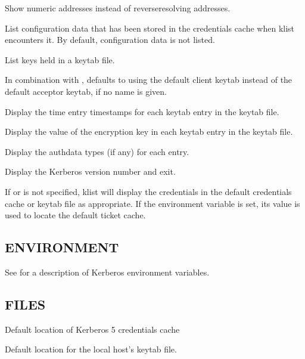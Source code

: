 \documentclass[letterpaper,10pt,english]{sphinxmanual}
\begin{document}
\begin{description}
\sphinxAtStartPar
Show numeric addresses instead of reverse\sphinxhyphen{}resolving addresses.

\sphinxAtStartPar
List configuration data that has been stored in the credentials
cache when klist encounters it.  By default, configuration data
is not listed.

\sphinxAtStartPar
List keys held in a keytab file.

\sphinxAtStartPar
In combination with , defaults to using the default client
keytab instead of the default acceptor keytab, if no name is
given.

\sphinxAtStartPar
Display the time entry timestamps for each keytab entry in the
keytab file.

\sphinxAtStartPar
Display the value of the encryption key in each keytab entry in
the keytab file.

\sphinxAtStartPar
Display the authdata types (if any) for each entry.

\sphinxAtStartPar
Display the Kerberos version number and exit.

\end{description}

\sphinxAtStartPar
If  or  is not specified, klist will display
the credentials in the default credentials cache or keytab file as
appropriate.  If the  environment variable is set, its
value is used to locate the default ticket cache.


\subsection{ENVIRONMENT}
\label{\detokenize{user/user_commands/klist:environment}}
\sphinxAtStartPar
See {\hyperref[\detokenize{user/user_config/kerberos:kerberos-7}]{}} for a description of Kerberos environment
variables.


\subsection{FILES}
\label{\detokenize{user/user_commands/klist:files}}\begin{description}
\sphinxAtStartPar
Default location of Kerberos 5 credentials cache

\sphinxAtStartPar
Default location for the local host’s keytab file.

\end{description}
\end{document}

